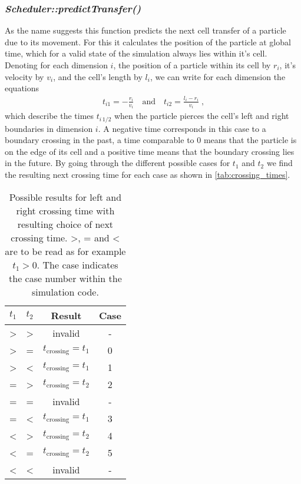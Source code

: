 \subsubsection{\quad \textit{Scheduler::predictTransfer()}}
As the name suggests this function predicts the next cell transfer of a particle due to its movement. For this it calculates the position of the particle at global time, which for a valid state of the simulation always lies within it's cell. Denoting for each dimension $i$, the position of a particle within its cell by $r_i$, it's velocity by $v_i$, and the cell's length by $l_i$, we can write for each dimension the equations
\begin{align}
t_{i1}=-\frac{r_i}{v_i} \quad \text{and} \quad t_{i2}=\frac{l_i-r_i}{v_i} \; \text{,}
\end{align}
which describe the times $t_{i \, 1/2}$ when the particle pierces the cell's left and right boundaries in dimension $i$. A negative time corresponds in this case to a boundary crossing in the past, a time comparable to 0 means that the particle is on the edge of its cell and a positive time means that the boundary crossing lies in the future. By going through the different possible cases for $t_1$ and $t_2$ we find the resulting next crossing time for each case as shown in \autoref{tab:crossing_times}.
\begin{table}[h]
\centering
\begin{tabular}{c|c||c|c}
$t_1$ & $t_2$ & Result & Case \\ \hline
> & > & invalid & - \\ \hline
> & = & $t_{\text{crossing}} = t_1$ & 0 \\ \hline
> & < & $t_{\text{crossing}} = t_1$ & 1 \\ \hline
= & > & $t_{\text{crossing}} = t_2$ & 2\\ \hline
= & = & invalid & - \\ \hline
= & < & $t_{\text{crossing}} = t_1$ & 3 \\ \hline
< & > & $t_{\text{crossing}} = t_2$ & 4 \\ \hline
< & = & $t_{\text{crossing}} = t_2$ & 5\\ \hline
< & < & invalid & - \\ \hline
\end{tabular}
\caption[Cell boundary crossing conditions]{Possible results for left and right crossing time with resulting choice of next crossing time. >, = and < are to be read as for example $t_1 > 0$. The case indicates the case number within the simulation code.}
\label{tab:crossing_times}
\end{table}

